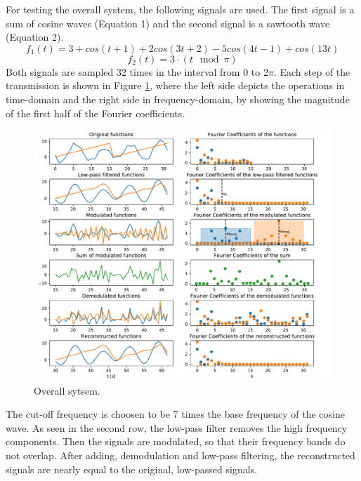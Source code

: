 \documentclass{article}
\begin{document}
For testing the overall system, the following signals are used.
The first signal is a sum of cosine waves (Equation 1)
and the second signal is a sawtooth wave (Equation 2).
\begin{equation}
    f_1(t) = 3 + cos(t+1) + 2cos(3t+2) - 5cos(4t-1) + cos(13t)
\end{equation}
\begin{equation}
    f_2(t) = 3 \cdot (t\mod\pi)
\end{equation}
Both signals are sampled 32 times in the interval from 0 to 2\(\pi\).
Each step of the transmission is shown in Figure \ref{fig:overall}, where the left side depicts the operations in time-domain
and the right side in frequency-domain, by showing the magnitude of the first half of the Fourier coefficients.
\begin{figure}[h!]
    \centering
    \includegraphics[width=\textwidth]{figures/overall_sampling.pdf}
    \caption{Overall sytsem.}
    \label{fig:overall}
\end{figure}

The cut-off frequency is choosen to be 7 times the base frequency of the cosine wave.
As seen in the second row, the low-pass filter removes the high frequency components.
Then the signals are modulated, so that their frequency bands do not overlap.
After adding, demodulation and low-pass filtering, the reconstructed signals are nearly equal to the original, low-passed signals.
\end{document}
